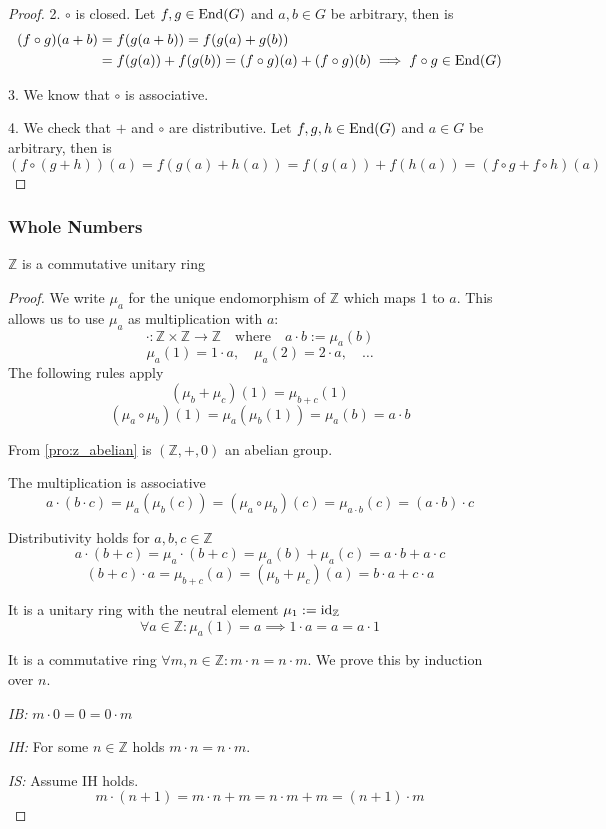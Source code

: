 \begin{proof}
   2. \(\circ\) is closed.
   Let \(f, g \in \operatorname{End}(G)\) and \(a, b \in G\) be arbitrary, then is
   \begin{equation*}
      \begin{split}
         (f \circ g)(a + b) & = f(g(a + b)) = f(g(a) + g(b))\\
                            & = f(g(a)) + f(g(b)) = (f \circ g)(a) + (f \circ g)(b) \implies f \circ g \in \operatorname{End}(G)
      \end{split}
   \end{equation*}

   3. We know that \(\circ\) is associative.

   4. We check that \(+\) and \(\circ\) are distributive.
   Let \(f, g, h \in \operatorname{End}(G)\) and \(a \in G\) be arbitrary, then is
   \[(f \circ (g + h))(a) = f(g(a) + h(a)) = f(g(a)) + f(h(a)) = (f \circ g + f \circ h)(a)\]
\end{proof}

\subsubsection{Whole Numbers}
\begin{proposition}\label{pro:ring_Z}
   \(\mathbb{Z}\) is a commutative unitary ring
\end{proposition}
\begin{proof}
   We write \(\mu_a\) for the unique endomorphism of \(\mathbb{Z}\) which maps 1 to \(a\).
   This allows us to use \(\mu_a\) as multiplication with \(a\):
   \[\cdot: \mathbb{Z} \times \mathbb{Z} \to \mathbb{Z} \quad\text{where}\quad a \cdot b := \mu_a(b)\]
   \[\mu_a(1) = 1 \cdot a, \quad \mu_a(2) = 2 \cdot a, \quad\ldots\]
   The following rules apply
   \[(\mu_b + \mu_c)(1) = \mu_{b + c}(1)\]
   \[(\mu_a \circ \mu_b)(1) = \mu_a(\mu_b(1)) = \mu_a(b) = a \cdot b\]

   From \cref{pro:z_abelian} is \((\mathbb{Z}, +, 0)\) an abelian group.

   The multiplication is associative
   \[a \cdot (b \cdot c) = \mu_a(\mu_b(c)) = (\mu_a \circ \mu_b)(c) = \mu_{a \cdot b}(c) = (a \cdot b) \cdot c\]

   Distributivity holds for \(a, b, c \in \mathbb{Z}\)
   \[a \cdot (b + c) = \mu_a \cdot (b + c) = \mu_a(b) + \mu_a(c) = a \cdot b + a \cdot c\]
   \[(b + c) \cdot a = \mu_{b + c}(a) = (\mu_b + \mu_c)(a) = b \cdot a + c \cdot a\]

   It is a unitary ring with the neutral element \(\mu_1 := \operatorname{id}_{\mathbb{Z}}\)
   \[\forall a \in \mathbb{Z}: \mu_a(1) = a \implies 1 \cdot a = a = a \cdot 1\]

   It is a commutative ring \(\forall m, n \in \mathbb{Z}: m \cdot n = n \cdot m\).
   We prove this by induction over \(n\).

   \textit{IB:} \(m \cdot 0 = 0 = 0 \cdot m\)

   \textit{IH:} For some \(n \in \mathbb{Z}\) holds \(m \cdot n = n \cdot m\).

   \textit{IS:} Assume IH holds.
   \[m \cdot (n + 1) = m \cdot n + m = n \cdot m + m = (n + 1) \cdot m\]
\end{proof}

